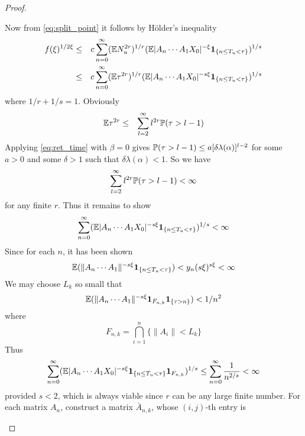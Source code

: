 \documentclass{article}
\theoremstyle{remark}
\begin{document}
\begin{proof}
\begin{enumerate}
    Now from \eqref{eq:split_point} it follows by H\"older's inequality
    \begin{eqnarray*}
      f(\xi)^{1/2\xi}
      &\leq&
      c \sum_{n=0}^\infty
      (\E N_u^{2r})^{1/r}
      (\E |A_n \cdots A_1 X_0|^{-\xi}\1{n \leq T_u < \tau})^{1/s} \\
      &\leq&
      c \sum_{n=0}^\infty
      (\E\tau^{2r})^{1/r}
      (\E |A_n \cdots A_1 X_0|^{-s\xi}\1{n \leq T_u < \tau})^{1/s}
    \end{eqnarray*}
    where $1/r + 1/s = 1$. Obviously
    \begin{eqnarray*}
      \E \tau^{2r}
      &\leq&
      \sum_{l=2}^\infty l^{2r} \P(\tau > l-1)
    \end{eqnarray*}
    Applying \eqref{eq:ret_time} with $\beta = 0$ gives $\P(\tau >
    l-1) \leq a [\delta \lambda(\alpha)]^{l-2}$ for some $a > 0$ and
    some $\delta > 1$ such that $\delta \lambda(\alpha) < 1$. So we
    have
    \begin{eqnarray*}
      \sum_{l=2}^\infty l^{2r} \P(\tau > l-1) < \infty
    \end{eqnarray*}
    for any finite $r$. Thus it remains to show
    \begin{eqnarray*}
      \sum_{n=0}^\infty
      (\E |A_n \cdots A_1 X_0|^{-s\xi}\1{n \leq T_u < \tau})^{1/s}
      < \infty
    \end{eqnarray*}
    Since for each $n$, it has been shown
    \begin{equation*}
      \E (\|A_n \cdots A_1\|^{-s\xi}\1{n \leq T_u < \tau})
      < y_n(s\xi)^{s\xi} < \infty
    \end{equation*}
    We may choose $L_k$ so small that
    \begin{equation*}
      \E (
      \|A_n \cdots A_1\|^{-s\xi}
      \I_{F_{n,k}}
      \1{\tau > n} 
      ) < {1 / n^2}
    \end{equation*}
    where
    \begin{equation*}
      F_{n,k} = \bigcap_{i=1}^n \{\|A_i\| < L_k\}
    \end{equation*}
    Thus
    \begin{equation*}
      \sum_{n=0}^\infty
      (\E |A_n \cdots A_1 X_0|^{-s\xi}\1{n \leq T_u < \tau} \I_{F_{n,k}})^{1/s}
      \leq
      \sum_{n=0}^\infty {1 \over n^{2/s}} < \infty
    \end{equation*}
    provided $s < 2$, which is always viable since $r$ can be any
    large finite number.
    For each matrix $A_n$, construct a matrix $\bar A_{n,k}$, whose
    $(i,j)$-th entry is

\end{enumerate}
\end{proof}
\end{document}

